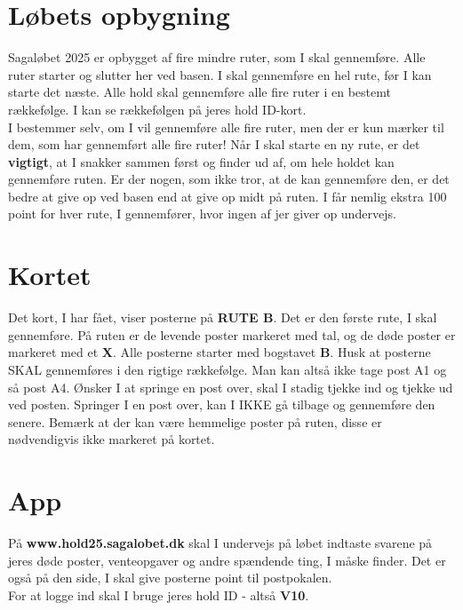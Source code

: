 \section{Løbets opbygning}
Sagaløbet 2025 er opbygget af fire mindre ruter, som I skal gennemføre. Alle ruter starter og slutter her ved basen. I skal gennemføre en hel rute, før I kan starte det næste. Alle hold skal gennemføre alle fire ruter i en bestemt rækkefølge. I kan se rækkefølgen på jeres hold ID-kort.\\\newline
I bestemmer selv, om I vil gennemføre alle fire ruter, men der er kun mærker til dem, som har gennemført alle fire ruter! Når I skal starte en ny rute, er det \textbf{vigtigt}, at I snakker sammen først og finder ud af, om hele holdet kan gennemføre ruten. Er der nogen, som ikke tror, at de kan gennemføre den, er det bedre at give op ved basen end at give op midt på ruten. I får nemlig ekstra 100 point for hver rute, I gennemfører, hvor ingen af jer giver op undervejs.\\
\section{Kortet}
Det kort, I har fået, viser posterne på \textbf{RUTE B}. Det er den første rute, I skal gennemføre. På ruten er de levende poster markeret med tal, og de døde poster er markeret med et \textbf{X}. Alle posterne starter med bogstavet \textbf{B}. Husk at posterne SKAL gennemføres i den rigtige rækkefølge. Man kan altså ikke tage post A1 og så post A4. Ønsker I at springe en post over, skal I stadig tjekke ind og tjekke ud ved posten. Springer I en post over, kan I IKKE gå tilbage og gennemføre den senere. Bemærk at der kan være hemmelige poster på ruten, disse er nødvendigvis ikke markeret på kortet.
\section{App}
På \textbf{www.hold25.sagalobet.dk} skal I undervejs på løbet indtaste svarene på jeres døde poster, venteopgaver og andre spændende ting, I måske finder. Det er også på den side, I skal give posterne point til postpokalen.\\
For at logge ind skal I bruge jeres hold ID - altså \textbf{V10}.
\newpage
